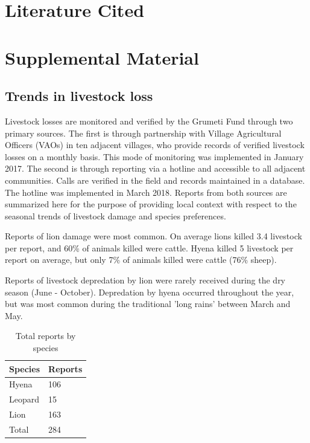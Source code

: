 \documentclass[12pt,]{article}
\begin{document}

\section{Literature Cited}


\section{Supplemental Material}
\subsection{Trends in livestock loss}
Livestock losses are monitored and verified by the Grumeti Fund through two primary sources. The first is through partnership with Village Agricultural Officers (VAOs) in ten adjacent villages, who provide records of verified livestock losses on a monthly basis. This mode of monitoring was implemented in January 2017. The second is through reporting via a hotline and accessible to all adjacent communities. Calls are verified in the field and records maintained in a database. The hotline was implemented in March 2018. Reports from both sources are summarized here for the purpose of providing local context with respect to the seasonal trends of livestock damage and species preferences.

Reports of lion damage were most common. On average lions killed 3.4 livestock per report, and 60\% of animals killed were cattle. Hyena killed 5 livestock per report on average, but only 7\% of animals killed were cattle (76\% sheep). 

Reports of livestock depredation by lion were rarely received during the dry season (June - October). Depredation by hyena occurred throughout the year, but was most common during the traditional 'long rains' between March and May.

\begin{table}[]
\caption{Total reports by species}
\centering
\begin{tabular}{ll}
\hline
\textbf{Species}                    & \textbf{Reports}   \\ \hline
Hyena                           & 106  \\
Leopard                          & 15 \\
Lion                            & 163  \\
Total                           & 284 \\ \hline
\end{tabular}

\label{tab:totalReports}
\end{table}
\end{document}
